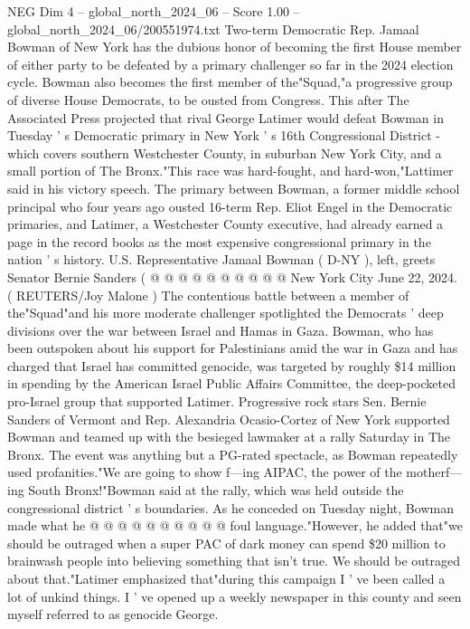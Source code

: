 \begin{textsample}{NEG Dim 4 – global\_north\_2024\_06 – Score 1.00 – global\_north\_2024\_06/200551974.txt}  \label{ex:f4_neg_313}
Two-term Democratic Rep.
Jamaal Bowman of New York has the dubious honor of becoming the first House member of either party to be defeated by a primary challenger so far in the 2024 election cycle.
Bowman also becomes the first member of the"Squad,"a progressive group of diverse House Democrats, to be ousted from Congress.
This after The Associated Press projected that rival George Latimer would defeat Bowman in Tuesday ' s Democratic primary in New York ' s 16th Congressional District - which covers southern Westchester County, in suburban New York City, and a small portion of The Bronx."This race was hard-fought, and hard-won,"Lattimer said in his victory speech.
The primary between Bowman, a former middle school principal who four years ago ousted 16-term Rep.
Eliot Engel in the Democratic primaries, and Latimer, a Westchester County executive, had already earned a page in the record books as the most expensive congressional primary in the nation ' s history.
U.S.
Representative Jamaal Bowman ( D-NY ), left, greets Senator Bernie Sanders ( @ @ @ @ @ @ @ @ @ @ New York City June 22, 2024. ( REUTERS/Joy Malone ) The contentious battle between a member of the"Squad"and his more moderate challenger spotlighted the Democrats ' deep divisions over the war between Israel and Hamas in Gaza.
Bowman, who has been outspoken about his support for Palestinians amid the war in Gaza and has charged that Israel has committed genocide, was targeted by roughly \$14 million in spending by the American Israel Public Affairs Committee, the deep-pocketed pro-Israel group that supported Latimer.
Progressive rock stars Sen.
Bernie Sanders of Vermont and Rep.
Alexandria Ocasio-Cortez of New York supported Bowman and teamed up with the besieged lawmaker at a rally Saturday in The Bronx.
The event was anything but a PG-rated spectacle, as Bowman repeatedly used profanities."We are going to show f---ing AIPAC, the power of the motherf---ing South Bronx!"Bowman said at the rally, which was held outside the congressional district ' s boundaries.
As he conceded on Tuesday night, Bowman made what he @ @ @ @ @ @ @ @ @ @ foul language."However, he added that"we should be outraged when a super PAC of dark money can spend \$20 million to brainwash people into believing something that isn't true.
We should be outraged about that."Latimer emphasized that"during this campaign I ' ve been called a lot of unkind things.
I ' ve opened up a weekly newspaper in this county and seen myself referred to as genocide George.

\end{textsample}
